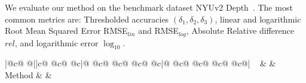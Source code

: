 \documentclass[10pt,twocolumn,letterpaper]{article}
\begin{document}
We evaluate our method on the benchmark dataset NYUv2 Depth~\cite{Nyuv2}. The most common metrics are: Thresholded accuracies $(\delta_1,\delta_2, 
\delta_3)$, linear and logarithmic Root Mean Squared Error RMSE$_{lin}$ and 
RMSE$_{log}$, Absolute Relative difference $rel$, and logarithmic error 
$\log_{10}$.

\begin{table*}[h]
	\footnotesize
	\begin{center}
\begin{tabular}{|@{\hspace{0.15em}}c@{\hspace{0.15em}}
					@{\hspace{0.15em}}||c@{\hspace{0.15em}}
					@{\hspace{0.15em}}c@{\hspace{0.15em}}
					@{\hspace{0.15em}}c|@{\hspace{0.15em}}
					@{\hspace{0.15em}}c@{\hspace{0.15em}}
					@{\hspace{0.15em}}c@{\hspace{0.15em}}
					@{\hspace{0.15em}}c@{\hspace{0.15em}}
					@{\hspace{0.15em}}c|@{\hspace{0.15em}}
					@{\hspace{0.15em}}c@{\hspace{0.15em}}
					@{\hspace{0.15em}}c@{\hspace{0.15em}}
					@{\hspace{0.15em}}c@{\hspace{0.15em}}
					@{\hspace{0.15em}}c@{\hspace{0.11em}}|
					}
\hline
				~ & 
				& 
				\\					
				Method & 
				& 
\end{tabular}
\end{center}
\end{table*}
\end{document}
